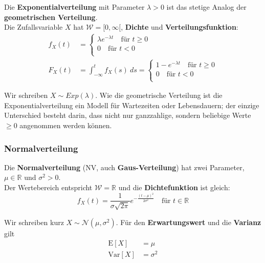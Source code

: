 \documentclass[11pt]{article}
\newcommand{\E}{\text{E}}
\newcommand{\Var}{\text{Var}}
\begin{document}
Die \textbf{Exponentialverteilung} mit Parameter $\lambda > 0$ ist das stetige Analog der \textbf{geometrischen Verteilung}. \\
Die Zufallsvariable $X$ hat $\mathcal{W} = [0, \infty[$, \textbf{Dichte} und \textbf{Verteilungsfunktion}:
\begin{equation*}
\begin{split}
	f_X(t) & = \begin{cases}
		\lambda e^{-\lambda t}\quad\text{für } t \geq 0 \\
		0 \quad\text{für } t < 0 \\
	\end{cases} \\
	F_X(t) & = \int_{-\infty}^t f_X(s)\ ds = \begin{cases}
		1 - e^{-\lambda t} \quad\text{für } t \geq 0 \\
		0 \quad\text{für } t < 0 \\
	\end{cases}
\end{split}
\end{equation*}

Wir schreiben $X \sim Exp(\lambda)$. Wie die geometrische Verteilung ist die Exponentialverteilung ein Modell für Wartezeiten oder Lebensdauern; der einzige Unterschied besteht darin, dass nicht nur ganzzahlige, sondern beliebige Werte $\geq 0$ angenommen werden können.

\subsubsection{Normalverteilung}

Die \textbf{Normalverteilung} (NV, auch \textbf{Gaus-Verteilung}) hat zwei Parameter, $\mu \in \mathbb{R}$ und $\sigma^2 > 0$. \\
Der Wertebereich entspricht $\mathcal{W} = \mathbb{R}$ und die \textbf{Dichtefunktion} ist gleich:
\begin{equation*}
	f_X(t) = \frac{1}{\sigma\sqrt{2\pi}}e^{-\frac{(t-\mu)^2}{2\sigma^2}}\quad\text{für } t \in \mathbb{R}
\end{equation*}

Wir schreiben kurz $X \sim \mathcal{N}(\mu, \sigma^2)$. Für den \textbf{Erwartungswert} und die \textbf{Varianz} gilt
\begin{equation*}
\begin{split}
	\E[X] & = \mu \\
	\Var[X] & = \sigma^2 \\
\end{split}
\end{equation*}
\end{document}
